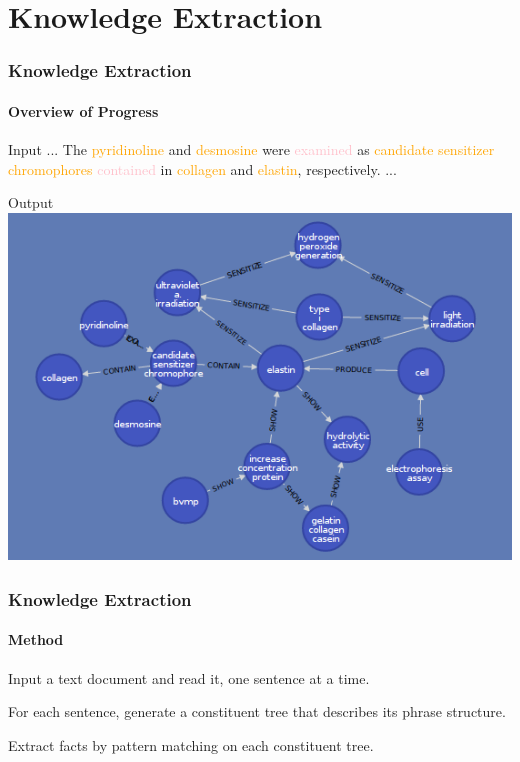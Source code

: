 \documentclass[mathserif]{beamer}
\begin{document}
\section{Knowledge Extraction}

\begin{frame}

\frametitle{Knowledge Extraction}
\framesubtitle{Overview of Progress}

\centering

\begin{block}{Input}
... The \textcolor{orange}{pyridinoline} and \textcolor{orange}{desmosine}
were \textcolor{pink}{examined} as \textcolor{orange}{candidate sensitizer chromophores}
\textcolor{pink}{contained} in \textcolor{orange}{collagen} and \textcolor{orange}{elastin},
respectively. ...
\end{block}

\begin{block}{Output}
\centering
\includegraphics[width=0.5\linewidth]{images/elastinneighborhood.png}
\end{block}

\end{frame}

\begin{frame}

\frametitle{Knowledge Extraction}
\framesubtitle{Method}

\begin{description}[<+->]

\item[Tokenization] Input a text document and read it, one sentence at a time.
\item[Parsing] For each sentence, generate a constituent tree that describes its phrase structure.
\item[Compilation] Extract facts by pattern matching on each constituent tree.

\end{description}

\end{frame}
\end{document}
